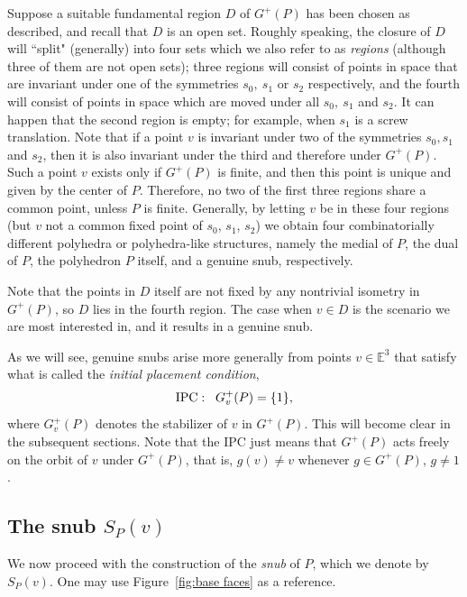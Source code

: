 \documentclass[12pt]{article}
\theoremstyle{definition}\newtheorem{definition}{Definition}[section]
\begin{document}
Suppose a suitable fundamental region $D$ of $G^+(P)$ has been chosen as described, and recall that $D$ is an open set. Roughly speaking, the closure of $D$ will ``split" (generally) into four sets which we also refer to as \textit{regions} (although three of them are not open sets); three regions will consist of points in space that are invariant under one of the symmetries $s_0, \ s_1$ or $s_2$ respectively, and the fourth will consist of points in space which are moved under all $s_0, \ s_1$ and $s_2$. It can happen that the second region is empty; for example, when $s_1$ is a screw translation. Note that if a point $v$ is invariant under two of the symmetries $s_0, s_1$ and $s_2$, then it is also invariant under the third and therefore under $G^+(P)$. Such a point $v$ exists only if $G^+(P)$ is finite, and then this point is unique and given by the center of $P$. Therefore, no two of the first three regions share a common point, unless $P$ is finite. Generally, by letting $v$ be in these four regions (but $v$ not a common fixed point of $s_0$, $s_{1}$, $s_{2}$) we obtain four combinatorially different polyhedra or polyhedra-like structures, namely the medial of $P$, the dual of $P$, the polyhedron $P$ itself, and a genuine snub, respectively. 
\smallskip

Note that the points in $D$ itself are not fixed by any nontrivial isometry in $G^+(P)$, so $D$ lies in the fourth region. The case when $v\in D$ is the scenario we are most interested in, and it results in a genuine snub. 

As we will see, genuine snubs arise more generally from points $v\in\mathbb{E}^3$ that satisfy what is called the \textit{initial placement condition}, 
\begin{equation}
\label{initialplacem}
{\rm IPC:}\;\;\; G_v^+(P)=\{1\},
\end{equation}
where $G_v^+(P)$ denotes the stabilizer of $v$ in $G^+(P)$. This will become clear in the subsequent sections. Note that the IPC  just means that $G^+(P)$ acts freely on the orbit of $v$ under $G^+(P)$, that is, 
$g(v)\neq v$ whenever $g\in G^+(P)$, $g\neq 1$. 

\subsection{The snub ${S}_P(v)$}
\label{snubcon}

We now proceed with the construction of the \textit{snub}  of $P$, which we denote by $S_P(v)$.  One may use Figure~\ref{fig:base faces} as a reference.  \smallskip
\end{document}
